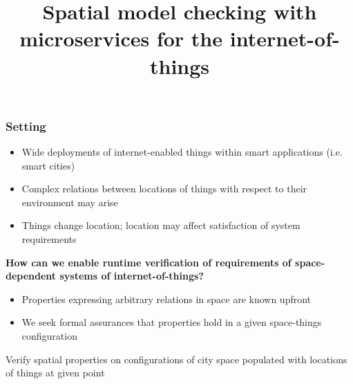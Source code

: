 \documentclass[pdf,10pt]{beamer}
\begin{document}
\title{\fontsize{14pt}{10}\selectfont Spatial model checking with microservices for the internet-of-things}


\begin{frame}
\titlepage
\end{frame}








\begin{frame}[t]\frametitle{Setting}
\centering

\begin{itemize} 

\item Wide deployments of internet-enabled things within smart applications (i.e. smart cities)
\item Complex relations between locations of things with respect to their environment may arise
\item Things change location; location may affect satisfaction of system requirements
 \end{itemize}
\pause
\textbf{How can we \textcolor{mLightBrown}{enable runtime verification} of requirements of space-dependent systems of internet-of-things? }
\pause
\vspace{0.2cm}
\begin{itemize} 
\fontsize{9pt}{10}\selectfont
 \item Properties expressing arbitrary relations in space are known upfront
 \item We seek formal assurances that properties hold in a given space-things configuration 
 \end{itemize}

 Verify spatial properties on configurations of city space populated with locations of things at given point
\end{frame}
\end{document}
